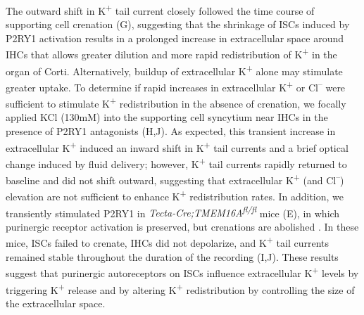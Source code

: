 \documentclass[9pt,lineno]{elife}
\begin{document}
The outward shift in K\textsuperscript{+} tail current closely followed the time course of supporting cell crenation (G), suggesting that the shrinkage of ISCs induced by P2RY1 activation results in a prolonged increase in extracellular space around IHCs that allows greater dilution and more rapid redistribution of K\textsuperscript{+} in the organ of Corti. Alternatively, buildup of extracellular K\textsuperscript{+} alone may stimulate greater uptake. To determine if rapid increases in extracellular K\textsuperscript{+} or Cl\textsuperscript{--} were sufficient to stimulate K\textsuperscript{+} redistribution in the absence of crenation, we focally applied KCl (130mM) into the supporting cell syncytium near IHCs in the presence of P2RY1 antagonists (H,J). As expected, this transient increase in extracellular K\textsuperscript{+} induced an inward shift in K\textsuperscript{+} tail currents and a brief optical change induced by fluid delivery; however, K\textsuperscript{+} tail currents rapidly returned to baseline and did not shift outward, suggesting that extracellular K\textsuperscript{+} (and Cl\textsuperscript{--}) elevation are not sufficient to enhance K\textsuperscript{+} redistribution rates. In addition, we transiently stimulated P2RY1 in \textit{Tecta-Cre;TMEM16A\textsuperscript{fl/fl}} mice (E), in which purinergic receptor activation is preserved, but crenations are abolished \citep{Wang2015}. In these mice, ISCs failed to crenate, IHCs did not depolarize, and K\textsuperscript{+} tail currents remained stable throughout the duration of the recording (I,J). These results suggest that purinergic autoreceptors on ISCs influence extracellular K\textsuperscript{+} levels by triggering K\textsuperscript{+} release and by altering K\textsuperscript{+} redistribution by controlling the size of the extracellular space.
\end{document}
